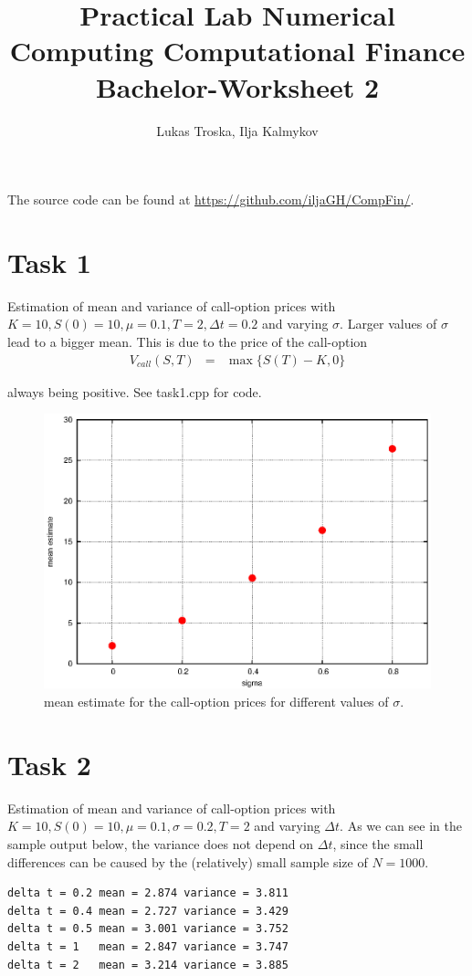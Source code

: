\documentclass[]{article}
\title{Practical Lab Numerical Computing Computational Finance \\Bachelor-Worksheet 2}
\author{Lukas Troska, Ilja Kalmykov}
\date{}
\begin{document}
\maketitle 

The source code can be found at \url{https://github.com/iljaGH/CompFin/}.

\section*{Task 1} Estimation of mean and variance of call-option prices with $K=10,S(0)=10,\mu=0.1,T=2,\Delta t=0.2$ and varying $\sigma$. Larger values of $\sigma$ lead to a bigger mean. This is
due to the price of the call-option
\begin{eqnarray*}
V_{call}\left(S,T\right) & = &\max \lbrace S(T)-K,0 \rbrace
\end{eqnarray*}

always being positive. See task1.cpp for code.
\begin{figure}[!ht]
\centering
\includegraphics{task1Plot}
\caption{mean estimate for the call-option prices for different values of
$\sigma$.}
\label{fig:Task1}
\end{figure}


\section*{Task 2} Estimation of mean and variance of call-option prices with $K=10,S(0)=10,\mu=0.1,\sigma=0.2,T=2$ and varying $\Delta t$. As we can see in the sample output below, the variance does not depend on $\Delta t$, since the small differences can be caused by the (relatively) small sample size of $N=1000$.
\begin{lstlisting}[caption = estimated $\mu$ and $\sigma$ for
different values of $\Delta t$ and N = 1.0E3, captionpos=b, label=lst:Task2] 
delta t = 0.2 mean = 2.874 variance = 3.811
delta t = 0.4 mean = 2.727 variance = 3.429
delta t = 0.5 mean = 3.001 variance = 3.752
delta t = 1   mean = 2.847 variance = 3.747
delta t = 2   mean = 3.214 variance = 3.885
\end{lstlisting}
\end{document}
